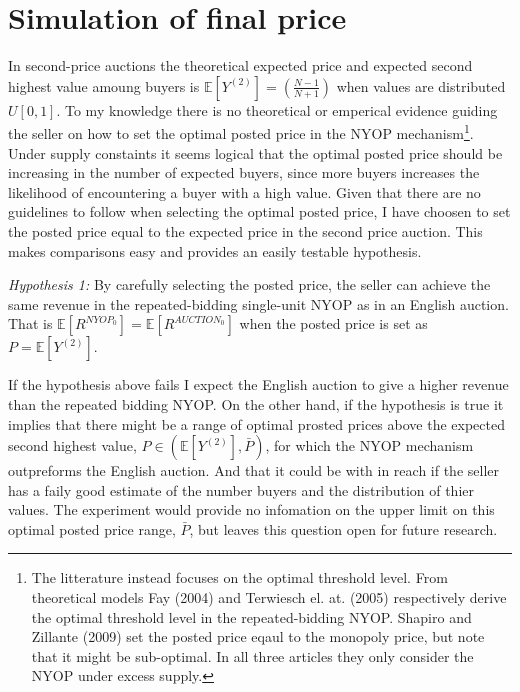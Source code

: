 \documentclass[a4paper,12pt]{article}
\begin{document}
	\section{Simulation of final price}
	In second-price auctions the theoretical expected price and expected second highest value amoung buyers is $\mathbb{E}[Y^{(2)}] = (\frac{N-1}{N+1})$ when values are distributed $U[0,1]$. To my knowledge there is no theoretical or emperical evidence guiding the seller on how to set the optimal posted price in the NYOP mechanism\footnote{The litterature instead focuses on the optimal threshold level. From theoretical models Fay (2004) and Terwiesch el. at. (2005) respectively derive the optimal threshold level in the repeated-bidding NYOP. Shapiro and Zillante (2009) set the posted price eqaul to the monopoly price, but note that it might be sub-optimal. In all three articles they only consider the NYOP under excess supply.}. Under supply constaints it seems logical that the optimal posted price should be increasing in the number of expected buyers, since more buyers increases the likelihood of encountering a buyer with a high value. Given that there are no guidelines to follow when selecting the optimal posted price, I have choosen to set the posted price equal to the expected price in the second price auction. This makes comparisons easy and provides an easily testable hypothesis.

	\emph{Hypothesis 1:} By carefully selecting the posted price, the seller can achieve the same revenue in the repeated-bidding single-unit NYOP as in an English auction. That is $\mathbb{E}[R^{NYOP_0}] = \mathbb{E}[R^{AUCTION_0}]$ when the posted price is set as $P = \mathbb{E}[Y^{(2)}]$.
	
	If the hypothesis above fails I expect the English auction to give a higher revenue than the repeated bidding NYOP. On the other hand, if the hypothesis is true it implies that there might be a range of optimal prosted prices above the expected second highest value, $P \in (\mathbb{E}[Y^{(2)}], \bar{P})$, for which the NYOP mechanism outpreforms the English auction. And that it could be with in reach if the seller has a faily good estimate of the number buyers and the distribution of thier values. The experiment would provide no infomation on the upper limit on this optimal posted price range, $\bar{P}$, but leaves this question open for future research.
	
\end{document}
